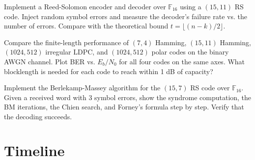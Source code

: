 \begin{exercise}[Computational]
Implement a Reed-Solomon encoder and decoder over $\mathbb{F}_{16}$ using a $(15, 11)$ RS code. Inject random symbol errors and measure the decoder's failure rate vs. the number of errors. Compare with the theoretical bound $t = \lfloor (n-k)/2 \rfloor$.
\end{exercise}

\begin{exercise}[Computational]
Compare the finite-length performance of $(7,4)$ Hamming, $(15,11)$ Hamming, $(1024,512)$ irregular LDPC, and $(1024,512)$ polar codes on the binary AWGN channel. Plot BER vs. $E_b/N_0$ for all four codes on the same axes. What blocklength is needed for each code to reach within 1 dB of capacity?
\end{exercise}

\begin{exercise}[Computational]
Implement the Berlekamp-Massey algorithm for the $(15,7)$ RS code over $\mathbb{F}_{16}$. Given a received word with 3 symbol errors, show the syndrome computation, the BM iterations, the Chien search, and Forney's formula step by step. Verify that the decoding succeeds.
\end{exercise}

\section{Timeline}
\label{sec:ec:timeline}

